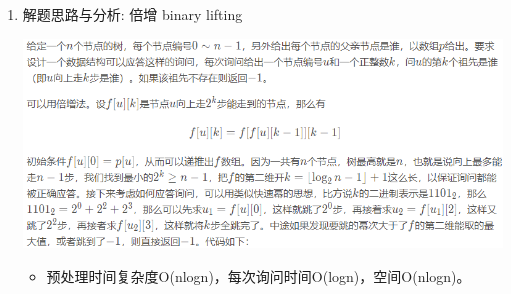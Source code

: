 \documentclass[9pt, b5paaper]{book}
\begin{document}
\begin{enumerate}
\item 解题思路与分析: 倍增 binary lifting
\label{sec-1-0-6-1}

\includegraphics[width=.9\linewidth]{./pic/1483.png}

\begin{itemize}
\item 预处理时间复杂度O(nlogn)，每次询问时间O(logn)，空间O(nlogn)。


\end{itemize}
\end{enumerate}
\end{document}
